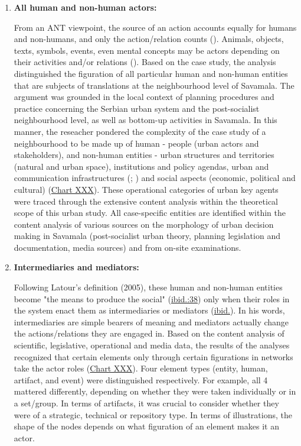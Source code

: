 \documentclass[11pt]{report}
\begin{document}
\begin{enumerate}
\item \textbf{All human and non-human actors:}

From an ANT viewpoint, the source of an action accounts equally for humans and non-humans, and only the action/relation counts (\href{Latour}{\citealt{latour_actor-network_1996}}). Animals, objects, texts, symbols, events, even mental concepts may be actors depending on their activities and/or relations (\href{Cerulo}{\citealt{cerulo_nonhumans_2009}}).
Based on the case study, the analysis distinguished the figuration of all particular human and non-human entities that are subjects of translations at the neighbourhood level of Savamala. The argument was grounded in the local context of planning procedures and practice concerning the Serbian urban system and the post-socialist neighbourhood level, as well as bottom-up activities in Savamala. In this manner, the reseacher pondered the complexity of the case study of a neighbourhood to be made up of human - people (urban actors and stakeholders), and non-human entities - urban structures and territories (natural and urban space), institutions and policy agendas, urban and communication infrastructures (\href{Mitchell}{\citealt{mitchell_city_1996}}; \href{Firmino}{\citealt{firmino_pervasive_2008}}) and social aspects (economic, political and cultural) (\href{Table ANT discource analysos}{Chart XXX}). These operational categories of urban key agents were traced through the extensive content analysis within the theoretical scope of this urban study. All case-specific entities are identified within the content analysis of various sources on the morphology of urban decision making in Savamala (post-socialist urban theory, planning legislation and documentation, media sources) and from on-site examinations.

\item \textbf{Intermediaries and mediators:}

Following Latour’s definition (2005), these human and non-human entities become "the means to produce the social" (\href{ref}{ibid.:38}) only when their roles in the system enact them as intermediaries or mediators (\href{ref}{ibid.}). In his words, intermediaries are simple bearers of meaning and mediators actually change the actions/relations they are engaged in. Based on the content analysis of scientific, legislative, operational and media data, the results of the analyses recognized that certain elements only through certain figurations in networks take the actor roles (\href{Table ANT discource analysis}{Chart XXX}). Four element types (entity, human, artifact, and event) were distinguished respectively. For example, all 4 mattered differently, depending on whether they were taken individually or in a set/group. In terms of artifacts, it was crucial to consider whether they were of a strategic, technical or repository type. In terms of illustrations, the shape of the nodes depends on what figuration of an element makes it an actor.


\end{enumerate}
\end{document}
